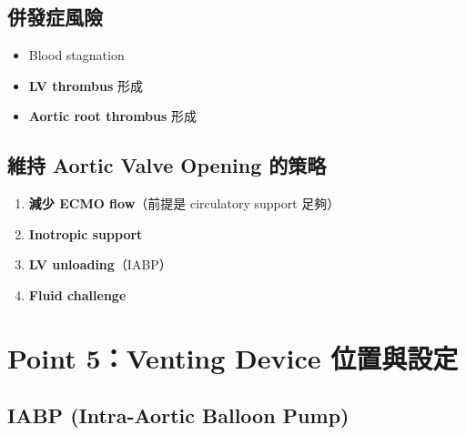 \documentclass[12pt,a4paper]{article}
\begin{document}
\subsection{併發症風險}

\begin{itemize}
    \item Blood stagnation
    \item \textbf{LV thrombus} 形成
    \item \textbf{Aortic root thrombus} 形成
\end{itemize}

\subsection{維持 Aortic Valve Opening 的策略}

\begin{enumerate}
    \item \textbf{減少 ECMO flow}（前提是 circulatory support 足夠）
    \item \textbf{Inotropic support}
    \item \textbf{LV unloading}（IABP）
    \item \textbf{Fluid challenge}
\end{enumerate}


\section{Point 5：Venting Device 位置與設定}

\subsection{IABP (Intra-Aortic Balloon Pump)}
\end{document}
